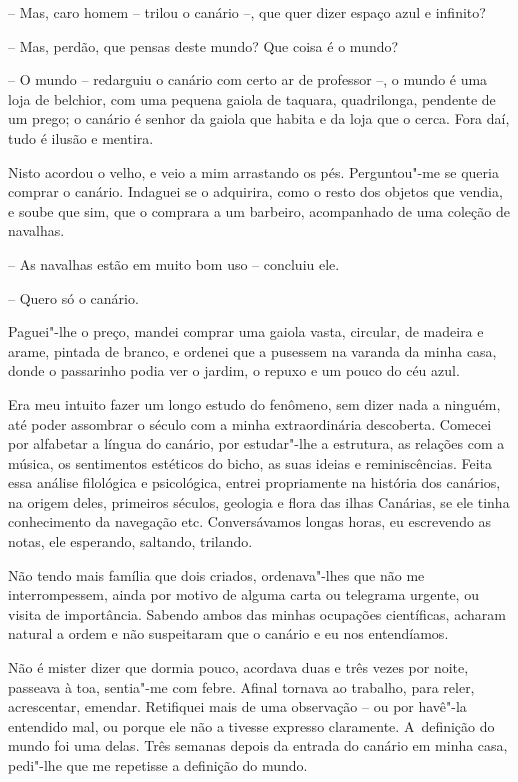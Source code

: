 -- Mas, caro homem -- trilou o canário --, que quer dizer espaço azul e
infinito?

-- Mas, perdão, que pensas deste mundo? Que coisa é o mundo?

-- O mundo -- redarguiu o canário com certo ar de professor --, o mundo
é uma loja de belchior, com uma pequena gaiola de taquara, quadrilonga,
pendente de um prego; o canário é senhor da gaiola que habita e da loja
que o cerca. Fora daí, tudo é ilusão e mentira.

Nisto acordou o velho, e veio a mim arrastando os pés. Perguntou"-me se
queria comprar o canário. Indaguei se o adquirira, como o resto dos
objetos que vendia, e soube que sim, que o comprara a um barbeiro,
acompanhado de uma coleção de navalhas.

-- As navalhas estão em muito bom uso -- concluiu ele.

-- Quero só o canário.

Paguei"-lhe o preço, mandei comprar uma gaiola vasta, circular, de
madeira e arame, pintada de branco, e ordenei que a pusessem na varanda
da minha casa, donde o passarinho podia ver o jardim, o repuxo e um
pouco do céu azul.

Era meu intuito fazer um longo estudo do fenômeno, sem dizer nada a
ninguém, até poder assombrar o século com a minha extraordinária
descoberta. Comecei por alfabetar a língua do canário, por estudar"-lhe a
estrutura, as relações com a música, os sentimentos estéticos do bicho,
as suas ideias e reminiscências. Feita essa análise filológica e
psicológica, entrei propriamente na história dos canários, na origem
deles, primeiros séculos, geologia e flora das ilhas Canárias, se ele
tinha conhecimento da navegação etc. Conversávamos longas horas, eu
escrevendo as notas, ele esperando, saltando, trilando.

Não tendo mais família que dois criados, ordenava"-lhes que não me
interrompessem, ainda por motivo de alguma carta ou telegrama urgente,
ou visita de importância. Sabendo ambos das minhas ocupações
científicas, acharam natural a ordem e não suspeitaram que o canário e
eu nos entendíamos.

Não é mister dizer que dormia pouco, acordava duas e três vezes por
noite, passeava à toa, sentia"-me com febre. Afinal tornava ao trabalho,
para reler, acrescentar, emendar. Retifiquei mais de uma observação --
ou por havê"-la entendido mal, ou porque ele não a tivesse expresso
claramente. A~definição do mundo foi uma delas. Três semanas depois da
entrada do canário em minha casa, pedi"-lhe que me repetisse a definição
do mundo.

